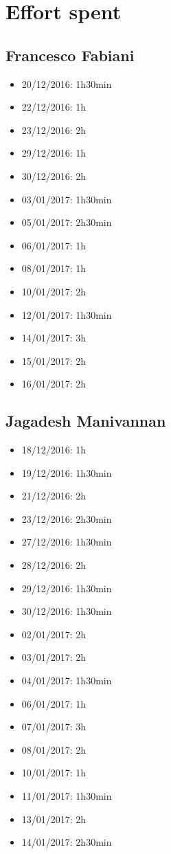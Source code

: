 \chapter{Effort	spent}

\section{Francesco Fabiani}
\begin{itemize}
	\item 20/12/2016: 1h30min
	\item 22/12/2016: 1h
	\item 23/12/2016: 2h
	\item 29/12/2016: 1h
	\item 30/12/2016: 2h
	\item 03/01/2017: 1h30min
	\item 05/01/2017: 2h30min
	\item 06/01/2017: 1h
	\item 08/01/2017: 1h
	\item 10/01/2017: 2h
	\item 12/01/2017: 1h30min
	\item 14/01/2017: 3h
	\item 15/01/2017: 2h
	\item 16/01/2017: 2h
\end{itemize}

\section{Jagadesh Manivannan}
\begin{itemize}
	\item 18/12/2016: 1h
	\item 19/12/2016: 1h30min
	\item 21/12/2016: 2h
	\item 23/12/2016: 2h30min
	\item 27/12/2016: 1h30min
	\item 28/12/2016: 2h
	\item 29/12/2016: 1h30min
	\item 30/12/2016: 1h30min
	\item 02/01/2017: 2h
	\item 03/01/2017: 2h
	\item 04/01/2017: 1h30min
	\item 06/01/2017: 1h
	\item 07/01/2017: 3h
	\item 08/01/2017: 2h
	\item 10/01/2017: 1h
	\item 11/01/2017: 1h30min
	\item 13/01/2017: 2h
	\item 14/01/2017: 2h30min
\end{itemize}

